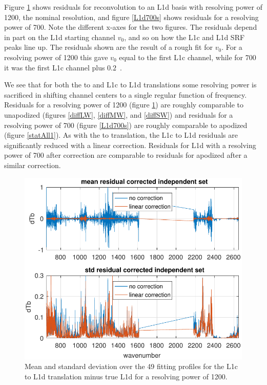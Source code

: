 \documentclass[10pt,twocolumn]{article}
\begin{document}
Figure \ref{L1d1200} shows residuals for reconvolution to an L1d
basis with resolving power of 1200, the nominal {\airs} resolution,
and figure \ref{L1d700s} shows residuals for a resolving power of
700.  Note the different x-axes for the two figures.  The residuals
depend in part on the L1d starting channel $v_0$, and so on how the
L1c and L1d SRF peaks line up.  The residuals shown are the result
of a rough fit for $v_0$.  For a resolving power of 1200 this gave
$v_0$ equal to the first L1c channel, while for 700 it was the first
L1c channel plus $0.2$~\wn.

We see that for both the {\airs} to {\cris} and L1c to L1d
translations some resolving power is sacrificed in shifting channel
centers to a single regular function of frequency.  Residuals for a
resolving power of 1200 (figure \ref{L1d1200}) are roughly
comparable to unapodized {\cris} (figures \ref{diffLW},
\ref{diffMW}, and \ref{diffSW}) and residuals for a resolving power
of 700 (figure \ref{L1d700s}) are roughly comparable to apodized
{\cris} (figure \ref{statAll1}).  As with the {\airs} to {\cris}
translation, the L1c to L1d residuals are significantly reduced with
a linear correction.  Residuals for L1d with a resolving power of
700 after correction are comparable to residuals for apodized
{\cris} after a similar correction.

\begin{figure} %
  \centering
  \includegraphics[width=\linewidth]{figures/L1d_cor1_1200.pdf}
  \caption{Mean and standard deviation over the 49 fitting profiles
    for the L1c to L1d translation minus true L1d for a resolving
    power of 1200.}
  \label{L1d1200}
\end{figure}
\end{document}
